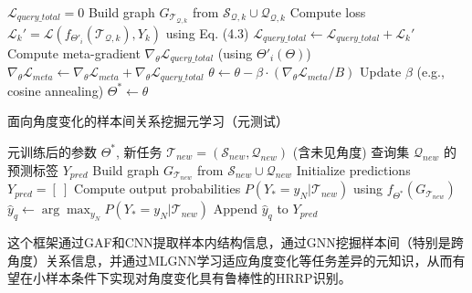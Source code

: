 \begin{algorithm}[htbp]
\begin{algorithmic}[1]
            \STATE $\mathcal{L}_{query\_total} = 0$
               \STATE Build graph $G_{\mathcal{T}_{\mathcal{Q},k}}$ from $\mathcal{S}_{\mathcal{Q},k} \cup \mathcal{Q}_{\mathcal{Q},k}$
               \STATE Compute loss $\mathcal{L}_k' = \mathcal{L}(f_{\Theta'_i}(\mathcal{T}_{\mathcal{Q},k}), Y_k)$ using Eq. (4.3)
               \STATE $\mathcal{L}_{query\_total} \leftarrow \mathcal{L}_{query\_total} + \mathcal{L}_k'$
            \ENDFOR
            \STATE Compute meta-gradient $\nabla_\theta \mathcal{L}_{query\_total}$ (using $\Theta'_i(\Theta)$)
            \STATE $\nabla_\theta \mathcal{L}_{meta} \leftarrow \nabla_\theta \mathcal{L}_{meta} + \nabla_\theta \mathcal{L}_{query\_total}$
        \ENDFOR
        \STATE $\theta \leftarrow \theta - \beta \cdot (\nabla_\theta \mathcal{L}_{meta} / B)$ %
        \STATE Update $\beta$ (e.g., cosine annealing)
    \ENDWHILE
    \STATE $\Theta^* \leftarrow \theta$
\end{algorithmic}
\end{algorithm}

\begin{algorithm}[htbp]
\caption{面向角度变化的样本间关系挖掘元学习（元测试）}
\label{alg:meta_testing_angle}
\begin{algorithmic}[1]
    \REQUIRE 元训练后的参数 $\Theta^*$, 新任务 $\mathcal{T}_{new} = (\mathcal{S}_{new}, \mathcal{Q}_{new})$ (含未见角度)
    \ENSURE 查询集 $\mathcal{Q}_{new}$ 的预测标签 $Y_{pred}$
    \STATE Build graph $G_{\mathcal{T}_{new}}$ from $\mathcal{S}_{new} \cup \mathcal{Q}_{new}$
    \STATE Initialize predictions $Y_{pred} = [~]$
        \STATE Compute output probabilities $P(Y_* = y_N | \mathcal{T}_{new})$ using $f_{\Theta^*}(G_{\mathcal{T}_{new}})$ %
        \STATE $\hat{y}_q \leftarrow \arg\max_{y_N} P(Y_* = y_N | \mathcal{T}_{new})$
        \STATE Append $\hat{y}_q$ to $Y_{pred}$
    \ENDFOR
\end{algorithmic}
\end{algorithm}

这个框架通过GAF和CNN提取样本内结构信息，通过GNN挖掘样本间（特别是跨角度）关系信息，并通过MLGNN学习适应角度变化等任务差异的元知识，从而有望在小样本条件下实现对角度变化具有鲁棒性的HRRP识别。


